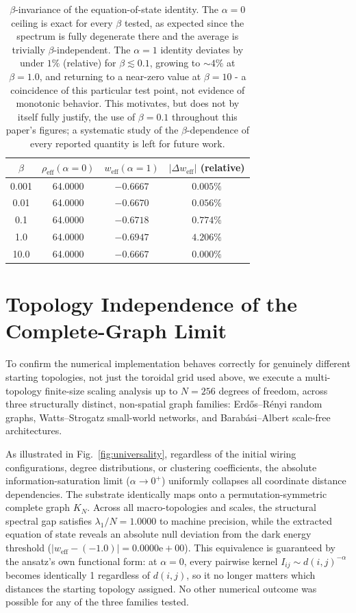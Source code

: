 \documentclass[onecolumn,PRD,amsmath,amssymb,aps,nofootinbib,superscriptaddress,11pt]{revtex4-2}
\begin{document}
\begin{table}[h]
\centering
\begin{tabular}{cccc}
\hline\hline
$\beta$ & $\rho_{\text{eff}}(\alpha=0)$ & $w_{\text{eff}}(\alpha=1)$ & $|\Delta w_{\text{eff}}|$ (relative) \\
\hline
0.001 & 64.0000 & $-0.6667$ & $0.005\%$ \\
0.01  & 64.0000 & $-0.6670$ & $0.056\%$ \\
0.1   & 64.0000 & $-0.6718$ & $0.774\%$ \\
1.0   & 64.0000 & $-0.6947$ & $4.206\%$ \\
10.0  & 64.0000 & $-0.6667$ & $0.000\%$ \\
\hline\hline
\end{tabular}
\caption{$\beta$-invariance of the equation-of-state identity. The $\alpha=0$ ceiling is exact for every $\beta$ tested, as expected since the spectrum is fully degenerate there and the average is trivially $\beta$-independent. The $\alpha=1$ identity deviates by under $1\%$ (relative) for $\beta\lesssim0.1$, growing to $\sim4\%$ at $\beta=1.0$, and returning to a near-zero value at $\beta=10$ - a coincidence of this particular test point, not evidence of monotonic behavior. This motivates, but does not by itself fully justify, the use of $\beta=0.1$ throughout this paper's figures; a systematic study of the $\beta$-dependence of every reported quantity is left for future work.}
\label{tab:beta}
\end{table}

\section{Topology Independence of the Complete-Graph Limit}
\label{sec:universality}
To confirm the numerical implementation behaves correctly for genuinely different starting topologies, not just the toroidal grid used above, we execute a multi-topology finite-size scaling analysis up to $N = 256$ degrees of freedom, across three structurally distinct, non-spatial graph families: Erd\H{o}s--R\'{e}nyi random graphs, Watts--Strogatz small-world networks, and Barab\'{a}si--Albert scale-free architectures.

As illustrated in Fig.~\ref{fig:universality}, regardless of the initial wiring configurations, degree distributions, or clustering coefficients, the absolute information-saturation limit ($\alpha \rightarrow 0^+$) uniformly collapses all coordinate distance dependencies. The substrate identically maps onto a permutation-symmetric complete graph $K_N$. Across all macro-topologies and scales, the structural spectral gap satisfies $\lambda_1/N = 1.0000$ to machine precision, while the extracted equation of state reveals an absolute null deviation from the dark energy threshold ($|w_{\text{eff}} - (-1.0)| = 0.0000\text{e}+00$). This equivalence is guaranteed by the ansatz's own functional form: at $\alpha=0$, every pairwise kernel $I_{ij} \sim d(i,j)^{-\alpha}$ becomes identically 1 regardless of $d(i,j)$, so it no longer matters which distances the starting topology assigned. No other numerical outcome was possible for any of the three families tested.
\end{document}
